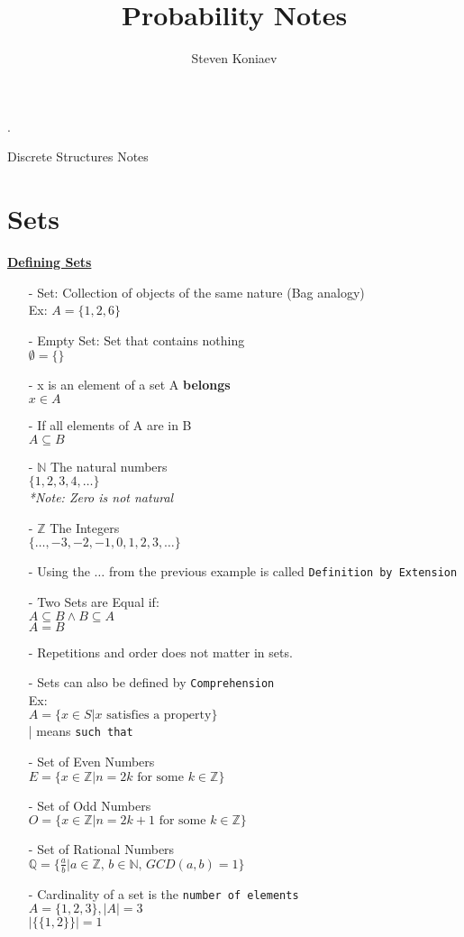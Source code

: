 \documentclass[12pt]{article}
\title{Probability Notes}
\author{Steven Koniaev}
\begin{document}
	
	\newcommand{\code}[1]{\colorbox{light-gray}{\texttt{#1}}}. 
	
	\begin{center}
		Discrete Structures Notes
	\end{center}

\section* {Sets} 
\underline{\textbf{Defining Sets}}
	\begin{itemize}
		\item[-] Set:
		Collection of objects of the same nature (Bag analogy) \\
		Ex: $A = \{1,2,6\}$ 
		\item[-] Empty Set: Set that contains nothing \\
		$ \emptyset = \{\}$
		\item[-] x is an element of a set A \textbf{belongs} \\
		$ x \in A $
		\item[-] If all elements of A are in B \\
		$ A \subseteq B$
		\item[-]  $\mathbb{N}$  The natural numbers \\
		$ \{1, 2, 3, 4, \ldots\} $ \\
		\textit{*Note: Zero is not natural} 
		\item[-]  $\mathbb{Z}$ The Integers \\
		$ \{\ldots, -3, -2, -1, 0, 1, 2, 3, \ldots\}  $
		\item[-] Using the \code{$\ldots$} from the previous example is called \code{Definition by Extension} \\
		\item[-] Two Sets are Equal if: \\
		$A \subseteq B \land B \subseteq A$ \\
		$A=B$
		\item[-] Repetitions and order does not matter in sets.
		\item[-] Sets can also be defined by \code{Comprehension} \\
		Ex: \\ $A = \{x\in S | x \text{ satisfies a property}\}$ \\
		| means \code{such that}\\
		\item[-] Set of Even Numbers \\ 
		$E = \{x \in \mathbb{Z} | n = 2k \text{ for some } k \in \mathbb{Z} \}$	
		\item[-] Set of Odd Numbers \\
		$O = \{x \in \mathbb{Z} | n = 2k+1 \text{ for some } k \in \mathbb{Z} \}$	
		\item[-] Set of Rational Numbers\\
		$\mathbb{Q} = \{ \frac{a}{b} | a \in \mathbb{Z}, \, b \in \mathbb{N}, \, GCD(a,b) =1 \}$	
		\item[-] Cardinality of a set is the \code{number of elements} \\
		 $A = \{1,2,3\},  |A| = 3$ \\
		 $|\{ \{1,2\} \}| = 1 $
		 

\end{itemize}
\end{document}
